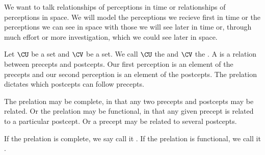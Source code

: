
\sbasic






\sstart
{}


We want to talk relationships
of perceptions in time or
relationships of perceptions in
space.
We will model the perceptions
we recieve first in time or the
perceptions we can see in space
with those we will see later in
time or, through much effort
or more investigation, which we
could see later in space.


Let $\CU$ be a set
and $\CV$ be a set.
We call $\CU$ the
and $\CV$ the .
A  is
a relation between precepts
and postcepts.
Our first perception is an
element of the precepts and
our second perception is an
element of the postcepts.
The prelation dictates which
postcepts can follow precepts.


The prelation may be
complete, in that any two precepts
and postcepts may be related.
Or the prelation may
be functional, in that any given
precept is related to a particular
postcept.
Or a precept may be related
to several postcepts.

If the prelation is complete, we say
call it .
If the prelation is functional, we call
it .
\strats
